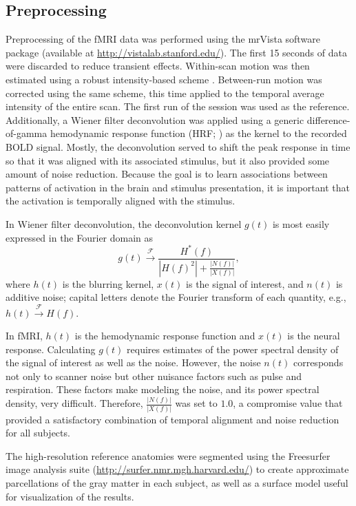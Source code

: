 \documentclass[5p,authoryear]{elsarticle}
\begin{document}
\subsection{Preprocessing}
Preprocessing of the fMRI data was performed using the mrVista software package (available at \url{http://vistalab.stanford.edu/}). 
The first 15 seconds of data  were discarded to reduce transient effects.
Within-scan motion was then estimated using a robust intensity-based scheme \citep{Nestares2000}. 
Between-run motion was corrected using the same scheme, this time applied to the temporal average intensity of the entire scan. 
The first run of the session was used as the reference. 
Additionally, a Wiener filter deconvolution \citep{Poor1980} was applied using a generic difference-of-gamma hemodynamic response function (HRF; \cite{Glover1999}) as the kernel to the recorded BOLD signal.
Mostly, the deconvolution served to shift the peak response in time so that it was aligned with its associated stimulus, but it also provided some amount of noise reduction.
Because the goal is to learn associations between patterns of activation in the brain and stimulus presentation, it is important that the activation is temporally aligned with the stimulus.

In Wiener filter deconvolution, the deconvolution kernel $g(t)$ is most easily expressed in the Fourier domain as
\begin{equation}
g(t) \xrightarrow{\mathcal{F}} \frac{H^{*}(f)}{\left|H(f)^{2}\right| + \frac{\left| N(f) \right|}{\left| X(f) \right|}},
\end{equation}
where $h(t)$ is the blurring kernel, $x(t)$ is the signal of interest, and $n(t)$ is additive noise; capital letters denote the Fourier transform of each quantity, e.g., $h(t) \xrightarrow{\mathcal{F}} H(f)$.

In fMRI, $h(t)$ is the hemodynamic response function and $x(t)$ is the neural response.
Calculating $g(t)$ requires estimates of the power spectral density of the signal of interest as well as the noise.
However, the noise $n(t)$ corresponds not only to scanner noise but other nuisance factors such as pulse and respiration.
These factors make modeling the noise, and its power spectral density, very difficult.
Therefore, $\frac{\left| N(f) \right|}{\left| X(f) \right|}$ was set to $1.0$, a compromise value that provided a satisfactory combination of temporal alignment and noise reduction for all subjects.

The high-resolution reference anatomies were segmented using the Freesurfer image analysis suite (\url{http://surfer.nmr.mgh.harvard.edu/}) to create approximate parcellations of the gray matter in each subject, as well as a surface model useful for visualization of the results.
\end{document}
